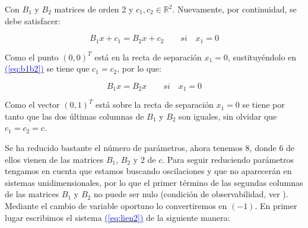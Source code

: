 \documentclass[12pt,a4paper]{report} %
\newcommand{\eref}[1]{\hyperref[#1]{\textcolor{blue}{(\ref*{#1})}}}
\newcommand{\eref}[1]{\hyperref[#1]{\textcolor{blue}{\textit{(\ref*{#1})}}}}
\begin{document}
	\noindent Con $B_1$ y $B_2$ matrices de orden 2 y $c_1, c_2 \in \mathbb{R}^2$. Nuevamente, por continuidad, se debe satisfacer:
	
	\begin{equation}
		\label{eq:b1b2}
		B_1x+c_1=B_2x+c_2 \qquad si \quad x_1=0
	\end{equation}\smallskip
	
	\noindent Como el punto $(0,0)^T$ está en la recta de separación $x_1=0$, sustituyéndolo en \eref{eq:b1b2} se tiene que $c_1=c_2$, por lo que:
	
	\begin{equation}
		B_1x=B_2x \qquad si \quad x_1=0
	\end{equation}\smallskip
	
	\noindent Como el vector $(0,1)^T$ está sobre la recta de separación $x_1=0$ se tiene por tanto que las dos últimas columnas de $B_1$ y $B_2$ son iguales, sin olvidar que $c_1=c_2=c$.


	\vspace{0.5cm}Se ha reducido bastante el número de parámetros, ahora tenemos 8, donde 6 de ellos vienen de las matrices $B_1$, $B_2$ y 2 de $c$. Para seguir reduciendo parámetros tengamos en cuenta que estamos buscando oscilaciones y que no aparecerán en sistemas unidimensionales, por lo que el primer término de las segundas columnas de las matrices $B_1$ y $B_2$ no puede ser nulo (condición de observabilidad, ver \cite{onsimplyfing}). Mediante el cambio de variable oportuno lo convertiremos en $(-1)$. En primer lugar escribimos el sistema \eref{eq:lien2} de la siguiente manera:
	
\end{document}
